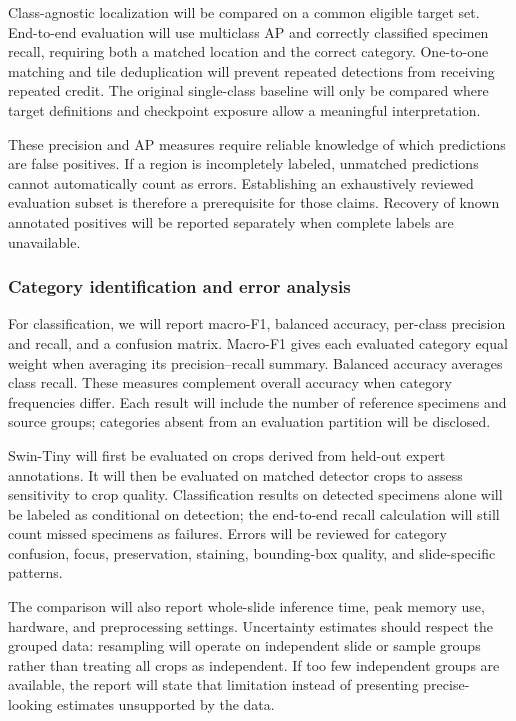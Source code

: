 \documentclass[11pt,letterpaper]{article}
\begin{document}
Class-agnostic localization will be compared on a common eligible target set. End-to-end evaluation will use multiclass AP and correctly classified specimen recall, requiring both a matched location and the correct category. One-to-one matching and tile deduplication will prevent repeated detections from receiving repeated credit. The original single-class baseline will only be compared where target definitions and checkpoint exposure allow a meaningful interpretation.

These precision and AP measures require reliable knowledge of which predictions are false positives. If a region is incompletely labeled, unmatched predictions cannot automatically count as errors. Establishing an exhaustively reviewed evaluation subset is therefore a prerequisite for those claims. Recovery of known annotated positives will be reported separately when complete labels are unavailable.

\subsubsection{Category identification and error analysis}
For classification, we will report macro-F1, balanced accuracy, per-class precision and recall, and a confusion matrix. Macro-F1 gives each evaluated category equal weight when averaging its precision--recall summary. Balanced accuracy averages class recall. These measures complement overall accuracy when category frequencies differ. Each result will include the number of reference specimens and source groups; categories absent from an evaluation partition will be disclosed.

Swin-Tiny will first be evaluated on crops derived from held-out expert annotations. It will then be evaluated on matched detector crops to assess sensitivity to crop quality. Classification results on detected specimens alone will be labeled as conditional on detection; the end-to-end recall calculation will still count missed specimens as failures. Errors will be reviewed for category confusion, focus, preservation, staining, bounding-box quality, and slide-specific patterns.

The comparison will also report whole-slide inference time, peak memory use, hardware, and preprocessing settings. Uncertainty estimates should respect the grouped data: resampling will operate on independent slide or sample groups rather than treating all crops as independent. If too few independent groups are available, the report will state that limitation instead of presenting precise-looking estimates unsupported by the data.
\end{document}
